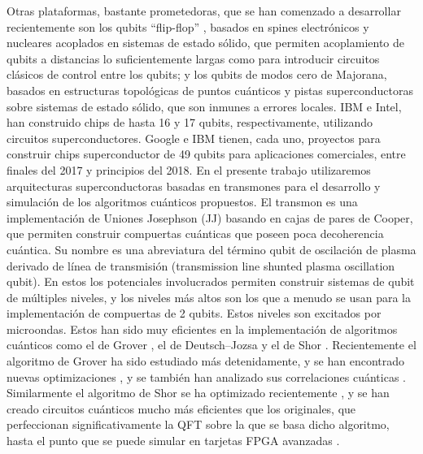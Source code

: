 Otras plataformas, bastante prometedoras, que se han comenzado a desarrollar recientemente son los qubits ``flip-flop'' \cite{Rotta_2017, Tosi_2017, Harris_2016, Koch_2007}, basados en spines electrónicos y nucleares acoplados en sistemas de estado sólido, que permiten acoplamiento de qubits a distancias lo suficientemente largas como para introducir circuitos clásicos de control entre los qubits; y los qubits de modos cero de Majorana, basados en estructuras topológicas de puntos cuánticos y pistas superconductoras sobre sistemas de estado sólido, que son inmunes a errores locales. IBM e Intel, han construido chips de hasta 16 y 17 qubits, respectivamente, utilizando circuitos superconductores. Google e IBM tienen, cada uno, proyectos para construir chips superconductor de 49 qubits para aplicaciones comerciales, entre finales del 2017 y principios del 2018.  En el presente trabajo utilizaremos arquitecturas superconductoras basadas en transmones para el desarrollo y simulación de los algoritmos cuánticos propuestos. El transmon \cite{Koch_2007} es una implementación de Uniones Josephson (JJ) basando en cajas de pares de Cooper, que permiten construir compuertas cuánticas que poseen poca decoherencia cuántica. Su nombre es una abreviatura del término qubit de oscilación de plasma derivado de línea de transmisión (transmission line shunted plasma oscillation qubit). En estos los potenciales involucrados permiten construir sistemas de qubit de múltiples niveles, y los niveles más altos son los que a menudo se usan para la implementación de compuertas de 2 qubits. Estos niveles son excitados por microondas. Estos han sido muy eficientes en la implementación de algoritmos cuánticos como el de Grover \cite{Grover_1996, Dewes_2012, Said_2017, DiCarlo_2009}, el de Deutsch–Jozsa \cite{DiCarlo_2009, Deutsch_1992, Zhao_2016} y el de Shor \cite{Shor_1999, Gambetta_2017, Monz_2016}.  Recientemente el algoritmo de Grover ha sido estudiado más detenidamente, y se han encontrado nuevas optimizaciones \cite{Chakrabarty_2017}, y se también han analizado sus correlaciones cuánticas \cite{Gubaidullina_2016, Ye_2016}. Similarmente el algoritmo de Shor se ha optimizado recientemente \cite{Dridi_2017, Johansson_2017}, y se han creado circuitos cuánticos mucho más eficientes que los originales, que perfeccionan significativamente la QFT sobre la que se basa dicho algoritmo, hasta el punto que se puede simular en tarjetas FPGA avanzadas \cite{Lee_2016}.

